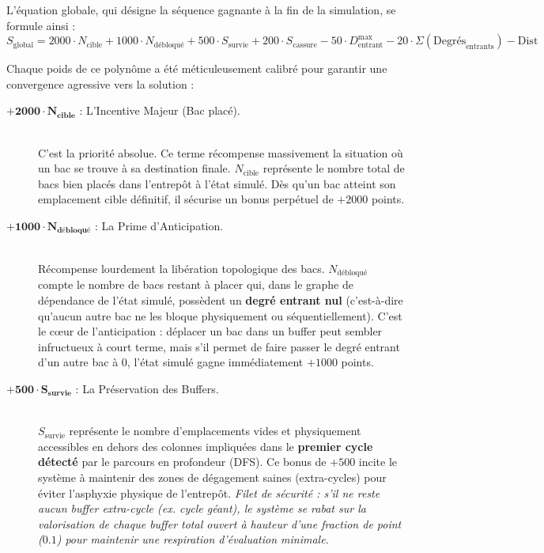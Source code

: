 \documentclass[11pt,a4paper]{article}
\begin{document}
L'équation globale, qui désigne la séquence gagnante à la fin de la simulation, se formule ainsi :
\begin{equation}
    S_{\text{global}} = 2000 \cdot N_{\text{cible}} + 1000 \cdot N_{\text{débloqué}} + 500 \cdot S_{\text{survie}} + 200 \cdot S_{\text{cassure}} - 50 \cdot D^{\text{max}}_{\text{entrant}} - 20 \cdot \Sigma(\text{Degrés}_{\text{entrants}}) - \text{Dist}
\end{equation}

Chaque poids de ce polynôme a été méticuleusement calibré pour garantir une convergence agressive vers la solution :
\begin{description}
    \item[$\mathbf{+2000 \cdot N_{\text{cible}}}$ : L'Incentive Majeur (Bac placé).] \hfill \\
    C'est la priorité absolue. Ce terme récompense massivement la situation où un bac se trouve à sa destination finale. $N_{\text{cible}}$ représente le nombre total de bacs bien placés dans l'entrepôt à l'état simulé. Dès qu'un bac atteint son emplacement cible définitif, il sécurise un bonus perpétuel de $+2000$ points.
    
    \item[$\mathbf{+1000 \cdot N_{\text{débloqué}}}$ : La Prime d'Anticipation.] \hfill \\
    Récompense lourdement la libération topologique des bacs. $N_{\text{débloqué}}$ compte le nombre de bacs restant à placer qui, dans le graphe de dépendance de l'état simulé, possèdent un \textbf{degré entrant nul} (c'est-à-dire qu'aucun autre bac ne les bloque physiquement ou séquentiellement). C'est le cœur de l'anticipation : déplacer un bac dans un buffer peut sembler infructueux à court terme, mais s'il permet de faire passer le degré entrant d'un autre bac à 0, l'état simulé gagne immédiatement $+1000$ points.

    \item[$\mathbf{+500 \cdot S_{\text{survie}}}$ : La Préservation des Buffers.] \hfill \\
    $S_{\text{survie}}$ représente le nombre d'emplacements vides et physiquement accessibles en dehors des colonnes impliquées dans le \textbf{premier cycle détecté} par le parcours en profondeur (DFS). Ce bonus de $+500$ incite le système à maintenir des zones de dégagement saines (extra-cycles) pour éviter l'asphyxie physique de l'entrepôt. \textit{Filet de sécurité : s'il ne reste aucun buffer extra-cycle (ex. cycle géant), le système se rabat sur la valorisation de chaque buffer total ouvert à hauteur d'une fraction de point ($0.1$) pour maintenir une respiration d'évaluation minimale.}


\end{description}
\end{document}
